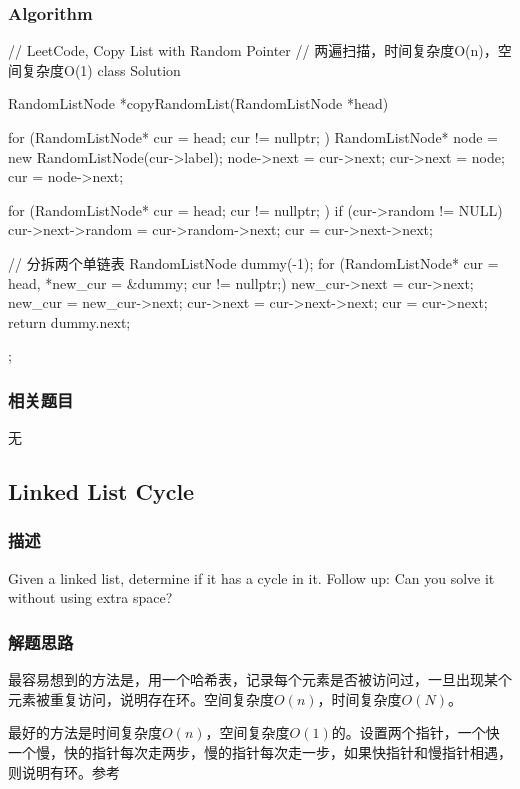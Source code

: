 \subsubsection{Algorithm}
\begin{Code}
	// LeetCode, Copy List with Random Pointer
	// 两遍扫描，时间复杂度O(n)，空间复杂度O(1)
	class Solution {
		RandomListNode *copyRandomList(RandomListNode *head) {
			for (RandomListNode* cur = head; cur != nullptr; ) {
				RandomListNode* node = new RandomListNode(cur->label);
				node->next = cur->next;
				cur->next = node;
				cur = node->next;
			}
			
			for (RandomListNode* cur = head; cur != nullptr; ) {
				if (cur->random != NULL)
					cur->next->random = cur->random->next;
				cur = cur->next->next;
			}
			
			// 分拆两个单链表
			RandomListNode dummy(-1);
			for (RandomListNode* cur = head, *new_cur = &dummy; cur != nullptr;) {
				new_cur->next = cur->next;
				new_cur = new_cur->next;
				cur->next = cur->next->next;
				cur = cur->next;
			}
			return dummy.next;
		}
	};
\end{Code}


\subsubsection{相关题目}
\begindot
\item 无
\myenddot


\subsection{Linked List Cycle}
\label{sec:Linked-List-Cycle}


\subsubsection{描述}
Given a linked list, determine if it has a cycle in it.
Follow up:
Can you solve it without using extra space?


\subsubsection{解题思路}
最容易想到的方法是，用一个哈希表，记录每个元素是否被访问过，一旦出现某个元素被重复访问，说明存在环。空间复杂度$O(n)$，时间复杂度$O(N)$。

最好的方法是时间复杂度$O(n)$，空间复杂度$O(1)$的。设置两个指针，一个快一个慢，快的指针每次走两步，慢的指针每次走一步，如果快指针和慢指针相遇，则说明有环。参考


